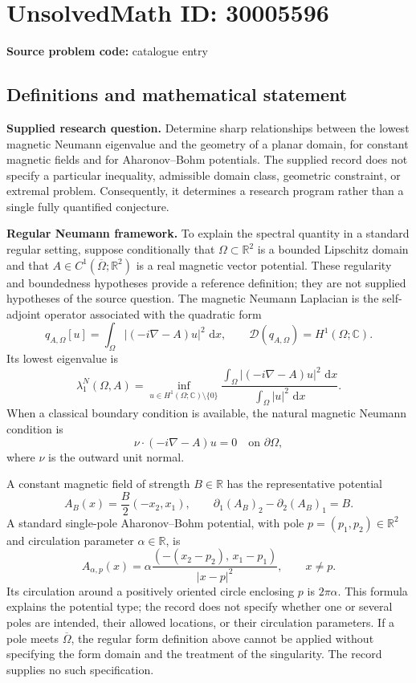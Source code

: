 \documentclass[11pt]{article}
\newcommand{\R}{\mathbb{R}}
\newcommand{\C}{\mathbb{C}}
\newcommand{\dd}{\,\mathrm{d}}
\begin{document}
\section*{UnsolvedMath ID: 30005596}
\textbf{Source problem code:} catalogue entry
\subsection{Definitions and mathematical statement}
\textbf{Supplied research question.} Determine sharp relationships between the lowest magnetic Neumann eigenvalue and the geometry of a planar domain, for constant magnetic fields and for Aharonov--Bohm potentials. The supplied record does not specify a particular inequality, admissible domain class, geometric constraint, or extremal problem. Consequently, it determines a research program rather than a single fully quantified conjecture.

\textbf{Regular Neumann framework.} To explain the spectral quantity in a standard regular setting, suppose conditionally that \(\Omega\subset\R^2\) is a bounded Lipschitz domain and that \(A\in C^1(\overline\Omega;\R^2)\) is a real magnetic vector potential. These regularity and boundedness hypotheses provide a reference definition; they are not supplied hypotheses of the source question. The magnetic Neumann Laplacian is the self-adjoint operator associated with the quadratic form
\[
q_{A,\Omega}[u]=\int_\Omega\lvert(-i\nabla-A)u\rvert^2\,\dd x,
\qquad \mathcal D(q_{A,\Omega})=H^1(\Omega;\C).
\]
Its lowest eigenvalue is
\[
\lambda_1^N(\Omega,A)=
\inf_{u\in H^1(\Omega;\C)\setminus\{0\}}
\frac{\displaystyle\int_\Omega\lvert(-i\nabla-A)u\rvert^2\,\dd x}
{\displaystyle\int_\Omega\lvert u\rvert^2\,\dd x}.
\]
When a classical boundary condition is available, the natural magnetic Neumann condition is
\[
\nu\cdot(-i\nabla-A)u=0\quad\text{on }\partial\Omega,
\]
where \(\nu\) is the outward unit normal.

A constant magnetic field of strength \(B\in\R\) has the representative potential
\[
A_B(x)=\frac B2(-x_2,x_1),
\qquad \partial_1(A_B)_2-\partial_2(A_B)_1=B.
\]
A standard single-pole Aharonov--Bohm potential, with pole \(p=(p_1,p_2)\in\R^2\) and circulation parameter \(\alpha\in\R\), is
\[
A_{\alpha,p}(x)=\alpha\frac{(-(x_2-p_2),\,x_1-p_1)}{|x-p|^2},
\qquad x\ne p.
\]
Its circulation around a positively oriented circle enclosing \(p\) is \(2\pi\alpha\). This formula explains the potential type; the record does not specify whether one or several poles are intended, their allowed locations, or their circulation parameters. If a pole meets \(\overline\Omega\), the regular form definition above cannot be applied without specifying the form domain and the treatment of the singularity. The record supplies no such specification.
\end{document}
